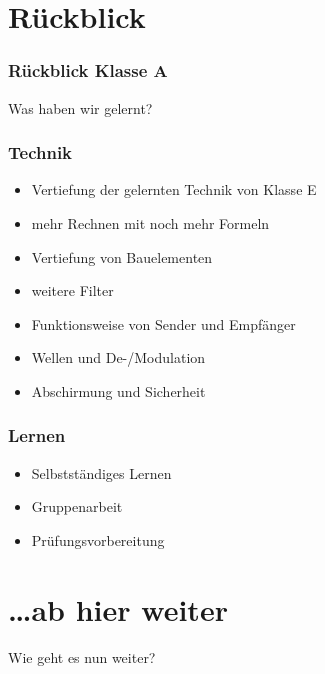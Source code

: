 

\usepackage{amssymb}
\subtitle{Organisatorisches 02\\ Abschluss Klasse A}
\date{Stand 14.03.2016}


\section{Rückblick}
\begin{frame}
  \frametitle{Rückblick Klasse A}
  \begin{center}
    {\Huge Was haben wir gelernt?}
  \end{center}
\end{frame}

\begin{frame}
  \frametitle{Technik}
  \begin{itemize}
    \item Vertiefung der gelernten Technik von Klasse E
    \item mehr Rechnen mit noch mehr Formeln
    \item Vertiefung von Bauelementen
    \item weitere Filter
    \item Funktionsweise von Sender und Empfänger
    \item Wellen und De-/Modulation
    \item Abschirmung und Sicherheit
  \end{itemize}
\end{frame}

\begin{frame}
  \frametitle{Lernen}
  \begin{itemize}
    \item Selbstständiges Lernen
    \item Gruppenarbeit 
    \item Prüfungsvorbereitung 
  \end{itemize}
\end{frame}


\section{\ldots ab hier weiter}
\begin{frame}
  \begin{center}
    {\Huge Wie geht es nun weiter?}
  \end{center}
\end{frame}

